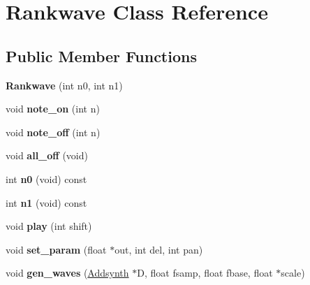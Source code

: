 \hypertarget{class_rankwave}{}\section{Rankwave Class Reference}
\label{class_rankwave}
\subsection*{Public Member Functions}
\begin{DoxyCompactItemize}
\item 
\mbox{\label{class_rankwave_abd3766c0c8803ed4a58183f08cf936ae}} 
{\bfseries Rankwave} (int n0, int n1)
\item 
\mbox{\label{class_rankwave_ac9a89836d67ccbfe15008123ec5ddc13}} 
void {\bfseries note\+\_\+on} (int n)
\item 
\mbox{\label{class_rankwave_aa3a1feb4b4913ec19134346e9c775b60}} 
void {\bfseries note\+\_\+off} (int n)
\item 
\mbox{\label{class_rankwave_ace85cf389a3535ba643f3ad948d900fa}} 
void {\bfseries all\+\_\+off} (void)
\item 
\mbox{\label{class_rankwave_a7a8e068c98b812259ec9c5bbe3a3490c}} 
int {\bfseries n0} (void) const
\item 
\mbox{\label{class_rankwave_a15600540ff37b2596c34c8d0e4355b0c}} 
int {\bfseries n1} (void) const
\item 
\mbox{\label{class_rankwave_a4eae1881022f1906bcd8fc9c733a1443}} 
void {\bfseries play} (int shift)
\item 
\mbox{\label{class_rankwave_af690e80673e5a18c5bc11332bbe12d6c}} 
void {\bfseries set\+\_\+param} (float $\ast$out, int del, int pan)
\item 
\mbox{\label{class_rankwave_ad9c42af64b62250c0a5ed339397baab4}} 
void {\bfseries gen\+\_\+waves} (\hyperlink{class_addsynth}{Addsynth} $\ast$D, float fsamp, float fbase, float $\ast$scale)
\item 
\mbox{\label{class_rankwave_aa8c5e1e880d3003f07dd568868acfbf7}} 

\end{DoxyCompactItemize}
